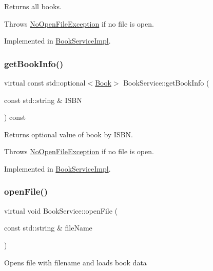 Returns all books.

Throws \hyperlink{structNoOpenFileException}{No\+Open\+File\+Exception} if no file is open. 

Implemented in \hyperlink{classBookServiceImpl_a7ef55efcff6a50977de2a97ce156838f}{Book\+Service\+Impl}.

\mbox{\label{classBookService_ad9da09e509b68ab1f7d93792206ce13c}} 
\subsubsection{\texorpdfstring{get\+Book\+Info()}{getBookInfo()}}
{\footnotesize\ttfamily virtual const std\+::optional$<$\hyperlink{classBook}{Book}$>$ Book\+Service\+::get\+Book\+Info (\begin{DoxyParamCaption}\item[{const std\+::string \&}]{I\+S\+BN }\end{DoxyParamCaption}) const\hspace{0.3cm}{\ttfamily [pure virtual]}}

Returns optional value of book by I\+S\+BN.

Throws \hyperlink{structNoOpenFileException}{No\+Open\+File\+Exception} if no file is open. 

Implemented in \hyperlink{classBookServiceImpl_adaf138469f4de2806de2a16aa92b288a}{Book\+Service\+Impl}.

\mbox{\label{classBookService_ad74916338cb66cfa8ae7dc24f60dec0e}} 
\subsubsection{\texorpdfstring{open\+File()}{openFile()}}
{\footnotesize\ttfamily virtual void Book\+Service\+::open\+File (\begin{DoxyParamCaption}\item[{const std\+::string \&}]{file\+Name }\end{DoxyParamCaption})\hspace{0.3cm}{\ttfamily [pure virtual]}}

Opens file with filename and loads book data

